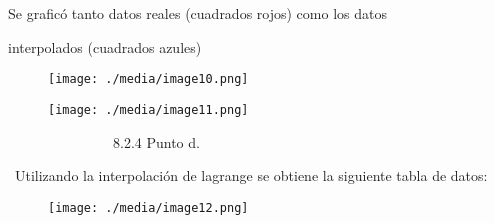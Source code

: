 \documentclass[12pt]{article}
\renewcommand{\_}{\kern-1.5pt\textunderscore\kern-1.5pt}
\begin{document}
\vspace{\baselineskip}
{\fontsize{11pt}{13.2pt}\selectfont \tab Se graficó tanto datos reales (cuadrados rojos) como los datos \par}\par

{\fontsize{11pt}{13.2pt}\selectfont \tab interpolados (cuadrados azules)\par}\par

\tab 
\vspace{\baselineskip}


\begin{figure}[H]
	\begin{Center}
		\texttt{[image: ./media/image10.png]}
	\end{Center}
\end{figure}



\par




\begin{figure}[H]
	\begin{Center}
		\texttt{[image: ./media/image11.png]}
	\end{Center}
\end{figure}



\par

\ \ \ \ \ \ \ \ \ \  \ \ \ \ \   8.2.4 Punto d.\par

\tab \  Utilizando la interpolación de lagrange se obtiene la siguiente tabla de datos:\par




\begin{figure}[H]
	\begin{Center}
		\texttt{[image: ./media/image12.png]}
	\end{Center}
\end{figure}
\end{document}
